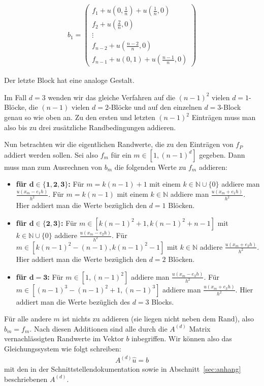 \documentclass[smallheadings]{scrartcl}
\numberwithin{equation}{section}
\begin{document}
\begin{align}
b_1=
\begin{pmatrix}
f_1 + u(0,\frac{1}{n}) + u(\frac{1}{n}, 0)  \\
f_2	+ u(\frac{2}{n}, 0)\\
\vdots	\\
f_{n-2}	+ u(\frac{n-2}{n}, 0)\\
f_{n-1}+u(0, 1) + u(\frac{n-1}{n}, 0)
\end{pmatrix}
\end{align}
\label{vkt:1}

Der letzte Block hat eine analoge Gestalt.

Im Fall $d=3$ wenden wir das gleiche Verfahren auf die $(n-1)^2$ vielen $d=1$-Blöcke, die $(n-1)$ vielen $d=2$-Blöcke und auf den einzelnen $d=3$-Block genau so wie oben an. Zu den ersten und letzten $(n-1)^2$ Einträgen muss man also bis zu drei zusätzliche Randbedingungen addieren. 

Nun betrachten wir die eigentlichen Randwerte, die zu den Einträgen von $f_P$ addiert werden sollen. Sei also $f_m$ für ein $m \in [1, (n-1)^d]$ gegeben. Dann muss man zum Ausrechnen von $b_m$ die folgenden Werte zu $f_m$ addieren:
 
 \begin{itemize}
\item \textbf{für $\boldsymbol{d\in \{1, 2, 3\} }$:}
Für $m = k(n-1)+1$ mit einem $k \in \mathbb{N}\cup \{0\}$ addiere man $\frac{u(x_m - e_1h)}{h^2}$. Für $m = k(n-1)$ mit einem $k \in \mathbb{N}$ addiere man $\frac{u(x_m + e_1h)}{h^2}$. Hier addiert man die Werte bezüglich den $d=1$ Blöcken.
\item \textbf{für $\boldsymbol{d\in \{2, 3\} }$:}
Für $m \in [k(n-1)^2+1, k(n-1)^2+n-1]$ mit  $k \in \mathbb{N}\cup \{0\}$ addiere $\frac{u(x_m-e_2h)}{h^2}$. Für $m \in [k(n-1)^2-(n-1), k(n-1)^2-1]$ mit $k \in \mathbb{N}$ addiere $\frac{u(x_m+e_2h)}{h^2}$. Hier addiert man die Werte bezüglich den $d=2$ Blöcken.
\item \textbf{für $\boldsymbol{d=3 }$:}
Für $m\in [1, (n-1)^2]$ addiere man $\frac{u(x_m-e_3h)}{h^2}$. Für $m\in [(n-1)^3-(n-1)^2+1, (n-1)^3]$ addiere man $\frac{u(x_m+e_3h)}{h^2}$.  Hier addiert man die Werte bezüglich des $d=3$ Blocks.
\end{itemize}
Für alle andere $m$ ist nichts zu addieren (sie liegen nicht neben dem Rand), also $b_m = f_m$. Nach diesen Additionen sind alle durch die $A^{(d)}$ Matrix vernachlässigten Randwerte im Vektor $b$ inbegriffen. Wir können also das Gleichungssystem wie folgt schreiben:
\begin{align}
A^{(d)}\hat{u}=b
\end{align}
mit den in der Schnittstellendokumentation sowie in Abschnitt~\ref{sec:anhang} beschriebenen $A^{(d)}$.
\end{document}
